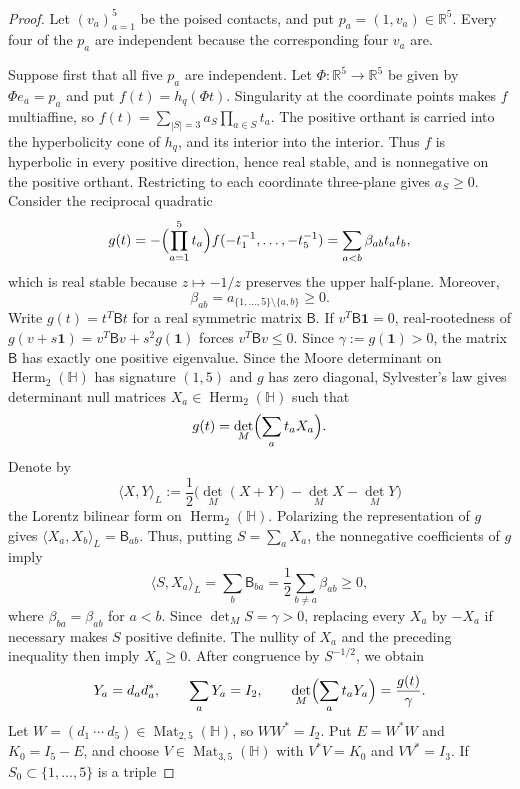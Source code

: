 \documentclass[11pt,onecolumn]{article}
\theoremstyle{blueplain}
\theoremstyle{bluedefinition}
\theoremstyle{bluedefinition}
\begin{document}
\begin{proof}
Let $(v_a)_{a=1}^5$ be the poised contacts, and put
$p_a=(1,v_a)\in\mathbb R^5$.  Every four of the $p_a$ are independent
because the corresponding four $v_a$ are.

Suppose first that all five $p_a$ are independent.  Let
$\Phi\colon\mathbb R^5\to\mathbb R^5$ be given by $\Phi e_a=p_a$ and put
$f(t)=h_q(\Phi t)$.  Singularity at the coordinate points makes $f$
multiaffine, so $f(t)=\sum_{|S|=3}a_S\prod_{a\in S}t_a$.
The positive orthant is carried into the hyperbolicity cone of $h_q$, and its interior into the interior.
Thus $f$ is hyperbolic in every positive direction, hence
real stable, and is nonnegative on the positive orthant.  Restricting to
each coordinate three-plane gives $a_S\geqslant0$.  Consider the reciprocal
quadratic
\[
 g(t)=-\Bigl(\prod_{a=1}^5t_a\Bigr)
 f(-t_1^{-1},\ldots,-t_5^{-1})
 =\sum_{a<b}\beta_{ab}t_at_b,
\]
which is real stable because $z\mapsto-1/z$ preserves the upper half-plane.
Moreover,
\[
 \beta_{ab}=a_{\{1,\ldots,5\}\setminus\{a,b\}}\geqslant0.
\]
Write $g(t)=t^T\mathsf Bt$ for a real symmetric
matrix $\mathsf B$.  If
$v^T\mathsf B\mathbf1=0$, real-rootedness of
$g(v+s\mathbf1)=v^T\mathsf Bv+s^2g(\mathbf1)$ forces
$v^T\mathsf Bv\leqslant0$.  Since
$\gamma:=g(\mathbf1)>0$, the matrix $\mathsf B$ has exactly one positive
eigenvalue.  Since the Moore determinant on
$\operatorname{Herm}_2(\mathbb H)$ has signature $(1,5)$ and $g$ has
zero diagonal, Sylvester's law gives determinant null matrices
$X_a\in\operatorname{Herm}_2(\mathbb H)$ such that
\[
 g(t)=\det_M\Bigl(\sum_at_aX_a\Bigr).
\]
Denote by
\[
 \langle X,Y\rangle_L
 :=\frac12\bigl(\det_M(X+Y)-\det_M X-\det_M Y\bigr)
\]
the Lorentz bilinear form on $\operatorname{Herm}_2(\mathbb H)$.
Polarizing the representation of $g$ gives
$\langle X_a,X_b\rangle_L=\mathsf B_{ab}$.  Thus, putting
$S=\sum_aX_a$, the nonnegative coefficients of $g$ imply
\[
 \langle S,X_a\rangle_L
 =\sum_b\mathsf B_{ba}
 =\frac12\sum_{b\ne a}\beta_{ab}\geqslant0,
\]
where $\beta_{ba}=\beta_{ab}$ for $a<b$.
Since $\det_M S=\gamma>0$, replacing every
$X_a$ by $-X_a$ if necessary makes $S$ positive definite.  The nullity
of $X_a$ and the preceding inequality then imply $X_a\geqslant0$.
After congruence by $S^{-1/2}$, we obtain
\[
 Y_a=d_ad_a^*,\qquad \sum_aY_a=I_2,\qquad
 \det_M\Bigl(\sum_at_aY_a\Bigr)=\frac{g(t)}\gamma.
\]
Let $W=(d_1\ \cdots\ d_5)\in\operatorname{Mat}_{2,5}(\mathbb H)$, so
$WW^*=I_2$.  Put $E=W^*W$ and $K_0=I_5-E$, and choose
$V\in\operatorname{Mat}_{3,5}(\mathbb H)$ with
$V^*V=K_0$ and $VV^*=I_3$.  If $S_0\subset\{1,\ldots,5\}$ is a triple

\end{proof}
\end{document}
